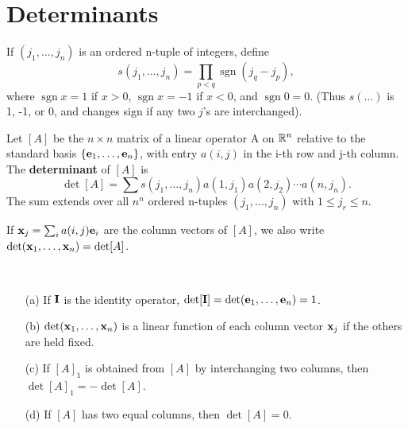 

\section{Determinants}


\begin{definition}[Determinant]
  \label{def:chap9:determinant}
  If $(j_1, \dots, j_n)$ is an ordered n-tuple of integers, define
  \[
    s(j_1, \dots, j_n) = \prod_{p<q} \operatorname{sgn}(j_q - j_p),
  \]
  where $\operatorname{sgn} x = 1$ if $x > 0$, $\operatorname{sgn} x
  = -1$ if $x < 0$, and $\operatorname{sgn} 0 = 0$. (Thus $s(\dots)$
  is 1, -1, or 0, and changes sign if any two $j$'s are interchanged).

  Let $[A]$ be the $n \times n$ matrix of a linear operator A on
  $\mathbb{R}^n$ relative to the standard basis $\{ \mathbf{e}_1, \dots,
  \mathbf{e}_n \}$, with entry $a(i, j)$ in the i-th row and j-th
  column. The \textbf{determinant} of $[A]$ is
  \[
    \det[A] = \sum s(j_1, \dots, j_n) a(1, j_1) a(2, j_2) \cdots a(n, j_n).
  \]
  The sum extends over all $n^n$ ordered n-tuples $(j_1, \dots, j_n)$
  with $1 \le j_r \le n$.

  If $\mathbf{x}_j = \sum_i a(i, j) \mathbf{e}_i$ are the column vectors
  of $[A]$, we also write $\det(\mathbf{x}_1, \dots, \mathbf{x}_n) = \det[A]$.
\end{definition}

\begin{theorem}
  \label{thm:chap9:determinant_properties}
  ~ %
  \begin{enumerate}
    \item[(a)] If $\mathbf{I}$ is the identity operator, $\det[\mathbf{I}] =
      \det(\mathbf{e}_1, \dots, \mathbf{e}_n) = 1$.
    \item[(b)] $\det(\mathbf{x}_1, \dots, \mathbf{x}_n)$ is a linear
      function of each column vector $\mathbf{x}_j$ if the others are held fixed.
    \item[(c)] If $[A]_1$ is obtained from $[A]$ by interchanging two
      columns, then $\det[A]_1 = -\det[A]$.
    \item[(d)] If $[A]$ has two equal columns, then $\det[A] = 0$.
  \end{enumerate}
\end{theorem}

